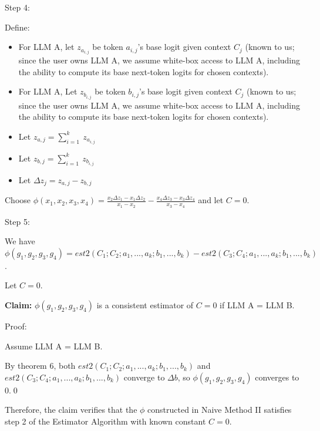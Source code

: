 \documentclass{article}
\begin{document}
Step 4:

Define:
\begin{itemize}
\item For LLM A, let $\displaystyle z_{a_{i,j}}$ be token $\displaystyle a_{i,j}$'s base logit given context $\displaystyle C_{j}$ (known to us; since the user owns LLM A, we assume white-box access to LLM A, including the ability to compute its base next-token logits for chosen contexts).
\item For LLM A, Let $\displaystyle z_{b_{i,j}}$ be token $\displaystyle b_{i,j}$'s base logit given context $\displaystyle C_{j}$ (known to us; since the user owns LLM A, we assume white-box access to LLM A, including the ability to compute its base next-token logits for chosen contexts).
\item Let $\displaystyle z_{a,j} =\sum _{i=1}^{k} \ z_{a_{i,j}}$
\item Let $\displaystyle z_{b,j} =\sum _{i=1}^{k} \ z_{b_{i,j}}$
\item Let $\displaystyle \Delta z_{j} =z_{a,j} -z_{b,j}$
\end{itemize}

Choose $\displaystyle \phi \left( x_{1} ,x_{2} ,x_{3} ,x_{4}\right) =\frac{x_{2} \Delta z_{1} -x_{1} \Delta z_{2}}{x_{1} -x_{2}} -\frac{x_{4} \Delta z_{3} -x_{3} \Delta z_{4}}{x_{3} -x_{4}}$ and let $\displaystyle C=0$.



Step 5:

We have $\displaystyle \phi \left( g_{1} ,g_{2} ,g_{3} ,g_{4}\right) =est2\left( C_{1} ;C_{2} ;a_{1} ,...,a_{k} ;b_{1} ,...,b_{k}\right) -est2\left( C_{3} ;C_{4} ;a_{1} ,...,a_{k} ;b_{1} ,...,b_{k}\right)$.

Let $\displaystyle C=0$.



\textbf{Claim:} $\displaystyle \phi \left( g_{1} ,g_{2} ,g_{3} ,g_{4}\right)$ is a consistent estimator of $\displaystyle C=0$ if LLM A = LLM B.



Proof:

Assume LLM A = LLM B.

By theorem 6, both $\displaystyle est2\left( C_{1} ;C_{2} ;a_{1} ,...,a_{k} ;b_{1} ,...,b_{k}\right)$ and $\displaystyle est2\left( C_{3} ;C_{4} ;a_{1} ,...,a_{k} ;b_{1} ,...,b_{k}\right)$ converge to $\displaystyle \Delta b$, so $\displaystyle \phi \left( g_{1} ,g_{2} ,g_{3} ,g_{4}\right)$ converges to 0.\qed 

Therefore, the claim verifies that the $\displaystyle \phi $ constructed in Naive Method II satisfies step 2 of the Estimator Algorithm with known constant $\displaystyle C=0$.
\end{document}
